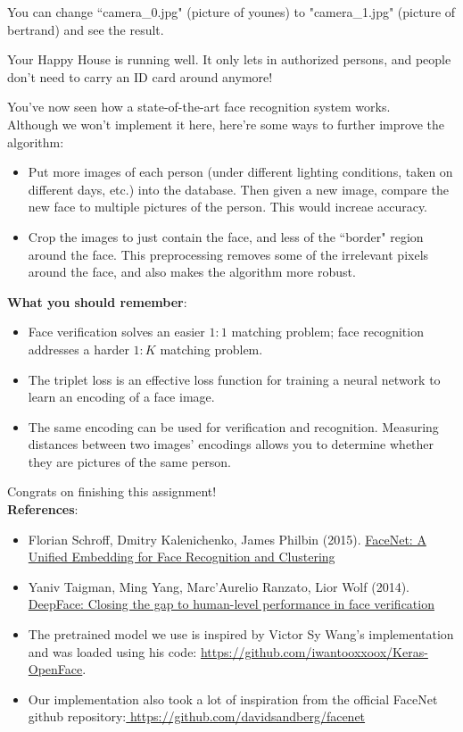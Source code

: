 You can change ``camera\_0.jpg" (picture of younes) to "camera\_1.jpg" (picture of bertrand) and see the result.

Your Happy House is running well. It only lets in authorized persons, and people don't need to carry an ID card around anymore!

You've now seen how a state-of-the-art face recognition system works.\\

Although we won't implement it here, here're some ways to further improve the algorithm:
\begin{itemize}
\item Put more images of each person (under different lighting conditions, taken on different days, etc.) into the database. Then given a new image, compare the new face to multiple pictures of the person. This would increae accuracy.
\item Crop the images to just contain the face, and less of the ``border" region around the face. This preprocessing removes some of the irrelevant pixels around the face, and also makes the algorithm more robust.
\end{itemize}

\begin{tcolorbox}
{\color{red}\textbf{What you should remember}:
\begin{itemize}
\item Face verification solves an easier $1:1$ matching problem; face recognition addresses a harder $1:K$ matching problem.
\item The triplet loss is an effective loss function for training a neural network to learn an encoding of a face image.
\item The same encoding can be used for verification and recognition. Measuring distances between two images' encodings allows you to determine whether they are pictures of the same person.
\end{itemize}
}
\end{tcolorbox}

Congrats on finishing this assignment!\\

{\textbf{References}}:
\begin{itemize}
\item Florian Schroff, Dmitry Kalenichenko, James Philbin (2015). \href{https://arxiv.org/pdf/1503.03832.pdf}{FaceNet: A Unified Embedding for Face Recognition and Clustering}
\item Yaniv Taigman, Ming Yang, Marc'Aurelio Ranzato, Lior Wolf (2014). \href{https://research.fb.com/wp-content/uploads/2016/11/deepface-closing-the-gap-to-human-level-performance-in-face-verification.pdf}{DeepFace: Closing the gap to human-level performance in face verification}
\item The pretrained model we use is inspired by Victor Sy Wang's implementation and was loaded using his code: \url{https://github.com/iwantooxxoox/Keras-OpenFace}.
\item Our implementation also took a lot of inspiration from the official FaceNet github repository:\url{ https://github.com/davidsandberg/facenet }
\end{itemize}
\clearpage

